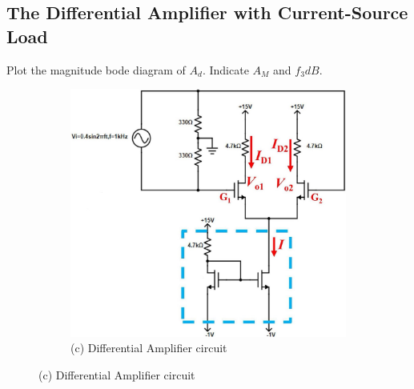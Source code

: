\documentclass{article}
\begin{document}
\begin{CJK*}{UTF8}{bkai}
\section{The Differential Amplifier with Current-Source Load}
Plot the magnitude bode diagram of $A_d$. Indicate $A_M$ and $f_3dB$. \\
\begin{figure}[h]
    \begin{center}
        \begin{subfigure}[b]{0.55\textwidth}
            \includegraphics[width=\textwidth]{diff_amp_circuit.jpg}
            \caption*{(c) Differential Amplifier circuit}
        \end{subfigure}
    \end{center}
\end{figure}
    
\end{CJK*}
\end{document}
